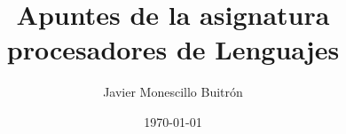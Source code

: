 \documentclass[a4paper,12pt]{book}
\begin{document}
\author{Javier Monescillo Buitrón}
\title{Apuntes de la asignatura procesadores de Lenguajes}
\date{\today}

\frontmatter
\maketitle
\tableofcontents


\mainmatter



\backmatter
\end{document}
